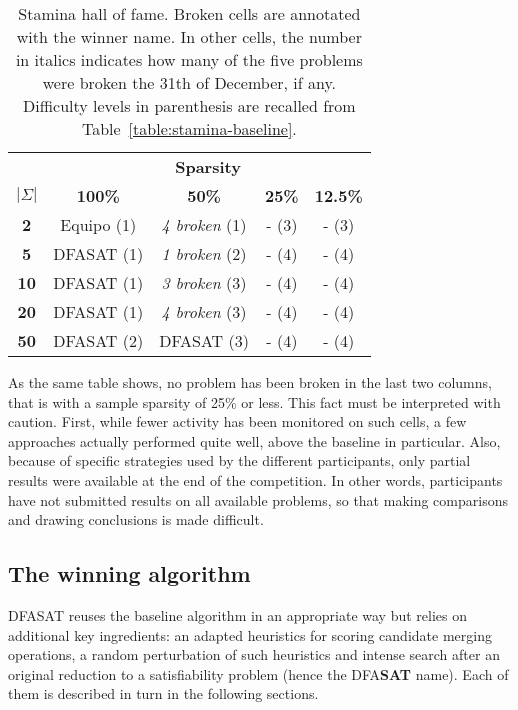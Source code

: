\begin{table}
\begin{center}
\begin{tabular}{c|c c c c}
&\multicolumn{4}{|c}{\textbf{Sparsity}}\\ 
\textbf{$|\Sigma|$} & \textbf{100\%} & \textbf{50\%} & \textbf{25\%} & \textbf{12.5\%}\\
\hline
\textbf{2}  & Equipo (1) & \emph{4 broken} (1)  & - (3) & - (3) \\
\textbf{5}  & DFASAT (1) & \emph{1 broken} (2)  & - (4) & - (4) \\
\textbf{10} & DFASAT (1) & \emph{3 broken} (3)  & - (4) & - (4) \\
\textbf{20} & DFASAT (1) & \emph{4 broken} (3)  & - (4) & - (4) \\
\textbf{50} & DFASAT (2) & DFASAT (3) & - (4) & - (4) \\
\end{tabular}
\end{center}
\caption{Stamina hall of fame. Broken cells are annotated with the winner name. In other cells, the number in italics indicates how many of the five problems were broken the 31th of December, if any. Difficulty levels in parenthesis are recalled from Table~\ref{table:stamina-baseline}.\label{table:stamina-hall-of-fame}}
\end{table}

As the same table shows, no problem has been broken in the last two columns, that is with a sample sparsity of 25\% or less. This fact must be interpreted with caution. First, while fewer activity has been monitored on such cells, a few approaches actually performed quite well, above the baseline in particular. Also, because of specific strategies used by the different participants, only partial results were available at the end of the competition. In other words, participants have not submitted results on all available problems, so that making comparisons and drawing conclusions is made difficult.

\subsection{The winning algorithm\label{subsection:stamina-winning}}

DFASAT reuses the baseline algorithm in an appropriate way but relies on additional key ingredients: an adapted heuristics for scoring candidate merging operations, a random perturbation of such heuristics and intense search after an original reduction to a satisfiability problem (hence the DFA\textbf{SAT} name). Each of them is described in turn in the following sections.

